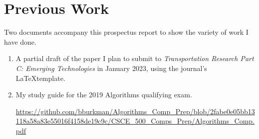 \section{Previous Work}

Two documents accompany this prospectus report to show the variety of work I have done.  

\begin{enumerate}
	\item A partial draft of the paper I plan to submit to {\it Transportation Research Part C:  Emerging Technologies} in January 2023, using the journal's \LaTeX template.  
	\item My study guide for the 2019 Algorithms qualifying exam.

\url{https://github.com/bburkman/Algorithms_Comp_Prep/blob/2fabe0e05bb13118a58a83e55016f4158de19c9c/CSCE_500_Comps_Prep/Algorithms_Comp.pdf}

\end{enumerate}


